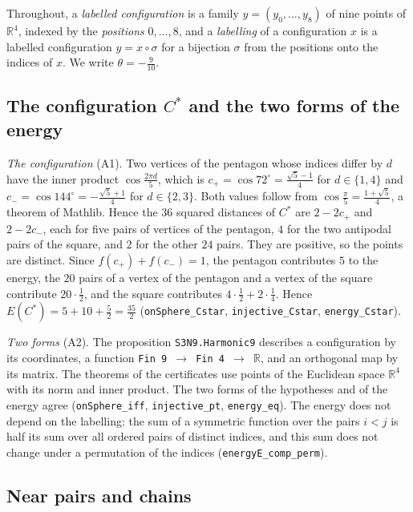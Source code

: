 \documentclass[reqno,a4paper,11pt]{amsart}
\numberwithin{equation}{section}
\def\R{{\mathbb R}}
\newcommand{\lean}[1]{\texttt{#1}}
\begin{document}
Throughout, a \emph{labelled configuration} is a family $y = (y_0, \dots, y_8)$ of nine points of $\R^4$, indexed by the \emph{positions} $0, \dots, 8$, and a \emph{labelling} of a configuration $x$ is a labelled configuration $y = x \circ \sigma$ for a bijection $\sigma$ from the positions onto the indices of $x$. We write $\theta = -\tfrac{9}{10}$.

\subsection{The configuration \texorpdfstring{$C^*$}{C*} and the two forms of the energy}

\emph{The configuration} (A1). Two vertices of the pentagon whose indices differ by $d$ have the inner product $\cos \tfrac{2 \pi d}{5}$, which is $c_+ = \cos 72^\circ = \tfrac{\sqrt5 - 1}{4}$ for $d \in \{1, 4\}$ and $c_- = \cos 144^\circ = -\tfrac{\sqrt5 + 1}{4}$ for $d \in \{2, 3\}$. Both values follow from $\cos \tfrac{\pi}{5} = \tfrac{1 + \sqrt5}{4}$, a theorem of Mathlib. Hence the $36$ squared distances of $C^*$ are $2 - 2 c_+$ and $2 - 2 c_-$, each for five pairs of vertices of the pentagon, $4$ for the two antipodal pairs of the square, and $2$ for the other $24$ pairs. They are positive, so the points are distinct. Since $f(c_+) + f(c_-) = 1$, the pentagon contributes $5$ to the energy, the $20$ pairs of a vertex of the pentagon and a vertex of the square contribute $20 \cdot \tfrac12$, and the square contributes $4 \cdot \tfrac12 + 2 \cdot \tfrac14$. Hence $E(C^*) = 5 + 10 + \tfrac52 = \tfrac{35}{2}$ (\lean{onSphere\_Cstar}, \lean{injective\_Cstar}, \lean{energy\_Cstar}).

\emph{Two forms} (A2). The proposition \lean{S3N9.Harmonic9} describes a configuration by its coordinates, a function \lean{Fin 9 $\to$ Fin 4 $\to$ $\R$}, and an orthogonal map by its matrix. The theorems of the certificates use points of the Euclidean space $\R^4$ with its norm and inner product. The two forms of the hypotheses and of the energy agree (\lean{onSphere\_iff}, \lean{injective\_pt}, \lean{energy\_eq}). The energy does not depend on the labelling: the sum of a symmetric function over the pairs $i < j$ is half its sum over all ordered pairs of distinct indices, and this sum does not change under a permutation of the indices (\lean{energyE\_comp\_perm}).

\subsection{Near pairs and chains}\label{sec:chains}
\end{document}
